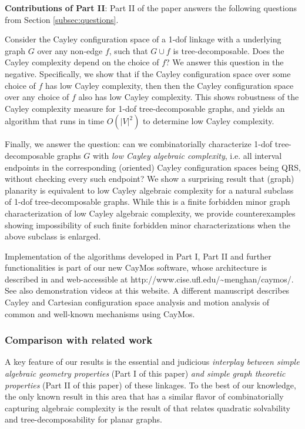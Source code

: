 \documentclass[secthm,amsthm,english]{article}
\theoremstyle{definition}
\theoremstyle{remark}
\begin{document}
\medskip

\noindent \textbf{Contributions of Part II}:  
Part II of the paper answers the following questions from Section \ref{subsec:questions}. 

Consider the Cayley configuration space of a 1-dof linkage with a underlying graph $G$ over any non-edge $f$, 
such that $G \cup f$ is tree-decomposable. 
Does the Cayley complexity  depend on the choice of $f$? We answer this question in the negative. 
Specifically, 
we show that if the Cayley configuration space over some choice of $f$ has low Cayley complexity, then 
then the Cayley configuration space over any choice of $f$ also has low Cayley complexity.
This shows robustness of the Cayley complexity measure for 1-dof tree-decomposable graphs, 
and yields an algorithm that runs in time $O(|V|^2)$ to determine low Cayley complexity.

Finally, we answer the question:  can we combinatorially characterize 1-dof
tree-decomposable graphs $G$ with \emph{low Cayley algebraic complexity}, 	i.e. all interval endpoints in the corresponding (oriented) Cayley configuration spaces being QRS, 
without checking every such endpoint? We show  a surprising result that (graph) planarity is equivalent
to low Cayley algebraic complexity for a natural subclass of 1-dof tree-decomposable graphs. 
While this is a finite forbidden minor graph characterization of
low Cayley algebraic complexity, we provide counterexamples showing impossibility of
such finite forbidden minor characterizations when the above subclass is
enlarged.

\bigskip
\noindent 
Implementation of the algorithms developed in Part I, Part II and further functionalities is part of our new CayMos software,
whose architecture is described in \cite{bib:caymos} and 
web-accessible at http://www.cise.ufl.edu/\~{}menghan/caymos/. 
See also demonstration videos at this website.
A different manuscript \cite{bib:beest} describes Cayley and Cartesian configuration space analysis and motion analysis 
of common and well-known mechanisms using CayMos.


\subsubsection{Comparison with related work}

A key feature of our results is the essential and judicious \emph{interplay
between simple algebraic geometry properties} (Part I of this paper)
\emph{and simple graph theoretic properties} (Part II of this paper)
of these linkages.
To the best of our knowledge, the only known result in this area that has a similar flavor
of combinatorially capturing algebraic complexity is the result of \cite{bib:Owen02} that relates quadratic
solvability and tree-decomposability for planar graphs.
\end{document}
